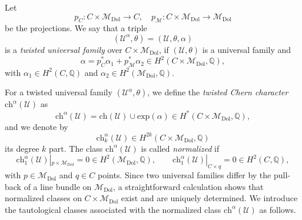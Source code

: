 \documentclass[11pt]{amsart}
\theoremstyle{plain}
\theoremstyle{definition}
\theoremstyle{remark}
\newcommand{\BQ}{{\mathbb{Q}}}
\newcommand{\CM}{{\mathcal M}}
\newcommand{\CU}{{\mathcal U}}
\begin{document}
Let
\[
p_C: C \times \CM_{\mathrm{Dol}} \to C,\quad  p_\CM: C \times \CM_{\mathrm{Dol}} \to  \CM_{\mathrm{Dol}}\]
be the projections. We say that a triple
\[
(\CU^\alpha, \theta) = (\CU, \theta, \alpha)
\]
is a {\em twisted universal family} over $C \times \CM_{\mathrm{Dol}}$, if $(\CU, \theta)$ is a universal family and 
\[
\alpha = p_C^\ast \alpha_1 +p_\CM^\ast \alpha_2 \in H^2(C\times \CM_{\mathrm{Dol}}, \BQ),
\]
with $\alpha_1 \in H^2(C, \BQ)$ and $\alpha_2 \in H^2(\CM_{\mathrm{Dol}}, \BQ)$.

For a twisted universal family $(\CU^\alpha, \theta)$, we define the {\em twisted Chern character} $\mathrm{ch}^\alpha(\CU)$ as
\begin{equation*}\label{uni_eqn1}
\mathrm{ch}^\alpha(\CU) = \mathrm{ch}(\CU) \cup \mathrm{exp}(\alpha) \in H^*(C\times \CM_{\mathrm{Dol}}, \BQ),
\end{equation*}
and we denote by 
\[
\mathrm{ch}_k^\alpha(\CU) \in H^{2k}(C\times \CM_{\mathrm{Dol}},\BQ)
\]
its degree $k$ part. The class $\mathrm{ch}^\alpha(\CU)$ is called \emph{normalized} if 
\[
\mathrm{ch}^\alpha_1(\CU)|_{p \times \CM_{\mathrm{Dol}}} =0 \in H^2(\CM_{\mathrm{Dol}}, \BQ), \qquad \mathrm{ch}^\alpha_1(\CU)|_{C \times q} =0 \in H^2(C, \BQ),
\]
with $p \in \CM_{\mathrm{Dol}}$ and $q\in C$ points.  Since two universal families differ by the pull-back
of a line bundle on $\CM_{\mathrm{Dol}}$,  a straightforward calculation shows that  normalized classes on $C\times \CM_{\mathrm{Dol}}$  exist
and are uniquely determined. We introduce the tautological classes associated with the normalized class $\mathrm{ch}^\alpha(\CU)$ as follows. 


\end{document}
